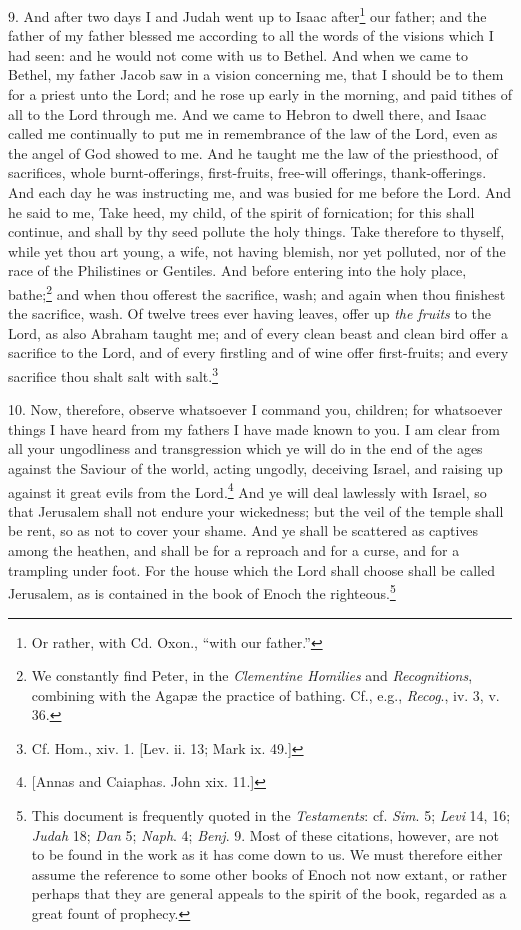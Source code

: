 9. And after two days I and Judah went up to Isaac after\footnote{Or rather, with Cd. Oxon., “with our father.”} our father; and the father of my father blessed me according to all the words of the visions which I had seen: and he would not come with us to Bethel. And when we came to Bethel, my father Jacob saw in a vision concerning me, that I should be to them for a priest unto the Lord; and he rose up early in the morning, and paid tithes of all to the Lord through me. And we came to Hebron to dwell there, and Isaac called me continually to put me in remembrance of the law of the Lord, even as the angel of God showed to me. And he taught me the law of the priesthood, of sacrifices, whole burnt-offerings, first-fruits, free-will offerings, thank-offerings. And each day he was instructing me, and was busied for me before the Lord. And he said to me, Take heed, my child, of the spirit of fornication; for this shall continue, and shall by thy seed pollute the holy things. Take therefore to thyself, while yet thou art young, a wife, not having blemish, nor yet polluted, nor of the race of the Philistines or Gentiles. And before entering into the holy place, bathe;\footnote{We constantly find Peter, in the \emph{Clementine Homilies} and \emph{Recognitions}, combining with the Agapæ the practice of bathing. Cf., e.g., \emph{Recog}., iv. 3, v. 36.} and when thou offerest the sacrifice, wash; and again when thou finishest the sacrifice, wash. Of twelve trees ever having leaves, offer up \emph{the fruits} to the Lord, as also Abraham taught me; and of every clean beast and clean bird offer a sacrifice to the Lord, and of every firstling and of wine offer first-fruits; and every sacrifice thou shalt salt with salt.\footnote{Cf. Hom., xiv. 1. [Lev. ii. 13; Mark ix. 49.]}

10. Now, therefore, observe whatsoever I command you, children; for whatsoever things I have heard from my fathers I have made known to you. I am clear from all your ungodliness and transgression which ye will do in the end of the ages against the Saviour of the world, acting ungodly, deceiving Israel, and raising up against it great evils from the Lord.\footnote{[Annas and Caiaphas. John xix. 11.]} And ye will deal lawlessly with Israel, so that Jerusalem shall not endure your wickedness; but the veil of the temple shall be rent, so as not to cover your shame. And ye shall be scattered as captives among the heathen, and shall be for a reproach and for a curse, and for a trampling under foot. For the house which the Lord shall choose shall be called Jerusalem, as is contained in the book of Enoch the righteous.\footnote{This document is frequently quoted in the \emph{Testaments}: cf. \emph{Sim}. 5; \emph{Levi} 14, 16; \emph{Judah} 18; \emph{Dan} 5; \emph{Naph}. 4; \emph{Benj}. 9. Most of these citations, however, are not to be found in the work as it has come down to us. We must therefore either assume the reference to some other books of Enoch not now extant, or rather perhaps that they are general appeals to the spirit of the book, regarded as a great fount of prophecy.}

